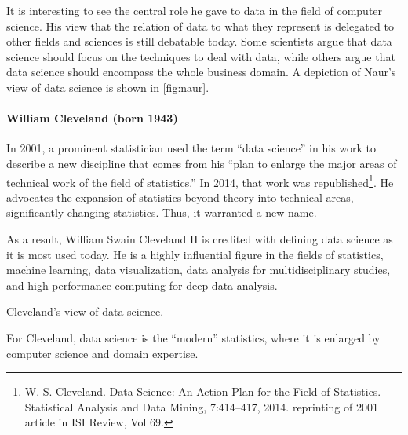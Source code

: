 It is interesting to see the central role he gave to data in the field of computer
science. His view that the relation of data to what they represent is delegated to other
fields and sciences is still debatable today.  Some scientists argue that data science
should focus on the techniques to deal with data, while others argue that data science
should encompass the whole business domain.  A depiction of Naur's view of data science is
shown in \cref{fig:naur}.

\def\clevelandds{(0,0) circle (20mm)}
\def\clevelandst{(0:-5mm) circle (15mm)}
\def\clevelandde {(2,1) circle (15mm)}
\def\clevelandcs {(2,-1) circle (15mm)}

\paragraph{William Cleveland (born 1943)}

In 2001, a prominent statistician used the term ``data science'' in his work to describe a
new discipline that comes from his ``plan to enlarge the major areas of technical work of
the field of statistics.''
In 2014, that work was republished\footnote{W. S. Cleveland.
Data Science: An Action Plan for the Field of Statistics. Statistical Analysis and Data
Mining, 7:414–417, 2014. reprinting of 2001 article in ISI Review, Vol 69.}.
He advocates the expansion of statistics beyond theory into technical areas, significantly
changing statistics.  Thus, it warranted a new name.

As a result, William Swain Cleveland II is credited with defining data science as it is most
used today. He is a highly influential figure in the fields of statistics, machine
learning, data visualization, data analysis for multidisciplinary studies, and high
performance computing for deep data analysis.

\begin{figurebox}[label=fig:cleveland]{Cleveland's view of data science.}
  \centering
  \tcblower
    For Cleveland, data science is the ``modern'' statistics,
    where it is enlarged by computer science and domain expertise.
\end{figurebox}

